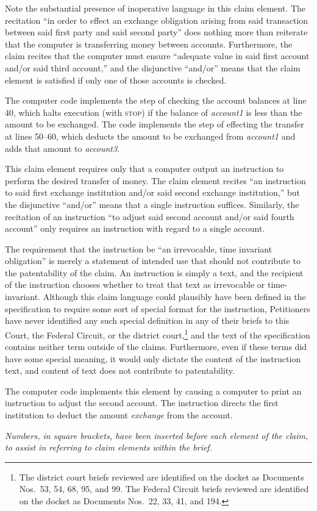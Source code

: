 \documentclass{scotus}
\begin{document}
Note the substantial presence of inoperative language in this claim element. The
recitation ``in order to effect an exchange obligation arising from said
transaction between said first party and said second party'' does nothing more
than reiterate that the computer is transferring money between accounts.
Furthermore, the claim recites that the computer must ensure ``adequate value in
said first account and/or said third account,'' and the disjunctive ``and/or''
means that the claim element is satisfied if only one of those accounts is
checked.

The computer code implements the step of checking the account balances at line
40, which halts execution (with \textsc{stop}) if the balance of
\emph{account1} is less than the amount to be exchanged. The code implements the
step of effecting the transfer at lines 50--60, which deducts the amount to be
exchanged from \emph{account1} and adds that amount to \emph{account3}.


This claim element requires only that a computer output an instruction to
perform the desired transfer of money. The claim element recites ``an
instruction to said first exchange institution and/or said second exchange
institution,'' but the disjunctive ``and/or'' means that a single instruction
suffices. Similarly, the recitation of an instruction ``to adjust said second
account and/or said fourth account'' only requires an instruction with regard to
a single account.

The requirement that the instruction be ``an irrevocable, time invariant
obligation'' is merely a statement of intended use that should not contribute to
the patentability of the claim. An instruction is simply a text, and the
recipient of the instruction chooses whether to treat that text as irrevocable
or time-invariant. Although this claim language could plausibly have been
defined in the specification to require some sort of special format for the
instruction, Petitioners have never identified any such special definition in
any of their briefs to this Court, the Federal Circuit, or the district
court,\footnote{The district court briefs reviewed are identified on the docket
as Documents Nos.\ 53, 54, 68, 95, and 99. The Federal Circuit briefs reviewed
are identified on the docket as Documents Nos.\ 22, 33, 41, and 194.}
and the text of the
specification contains neither term outside of the claims. Furthermore, even if
these terms did have some special meaning, it would only dictate the content of
the instruction text, and content of text does not contribute to patentability.

The computer code implements this element by causing a computer to print an
instruction to adjust the second account. The instruction directs the
first institution to deduct the amount \emph{exchange} from the account.


\emph{Numbers, in square brackets, have been inserted before each element of the
claim, to assist in referring to claim elements within the brief.}

\wholeclaim
\end{document}
